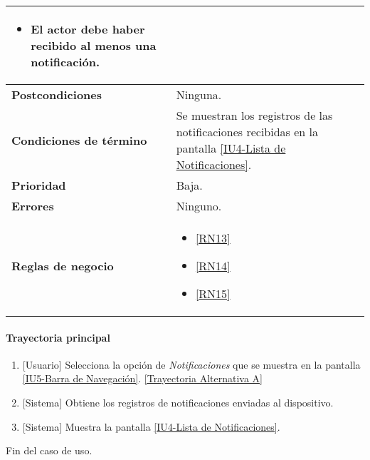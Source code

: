 \begin{longtable}{|J{5cm}|J{10.3cm}|}
\begin{itemize}
		    \item El actor debe haber recibido al menos una notificación.
		\end{itemize}
		\\ \hline
	\textbf{Postcondiciones} & Ninguna.
		\\ \hline
	\textbf{Condiciones de término} & Se muestran los registros de las notificaciones recibidas en la pantalla \hyperref[fig:Lista de Notificaciones]{[IU4-Lista de Notificaciones]}.
		\\ \hline 
	\textbf{Prioridad} & 
		Baja. \\ \hline
	\textbf{Errores} & Ninguno.
		\\ \hline
	\textbf{Reglas de negocio} & 
		\begin{itemize}
		 	\item \ref{RN13}
		 	\item \ref{RN14}
		 	\item \ref{RN15}
		\end{itemize}
		 \\ \hline
\end{longtable}

\paragraph{Trayectoria principal} \label{SUB-U-CU1.9:TP}
	\begin{enumerate}
		\item {[Usuario]} Selecciona la opción de \textit{Notificaciones} que se muestra en la pantalla  \hyperref[fig:Barra de navegacion]{[IU5-Barra de Navegación]}. \hyperref[SUB-U-CU1.9:TA]{[Trayectoria Alternativa A]}
		\item {[Sistema]} Obtiene los registros de notificaciones enviadas al dispositivo.
		\item {[Sistema]} Muestra la pantalla \hyperref[fig:Lista de Notificaciones]{[IU4-Lista de Notificaciones]}.
	\end{enumerate}
	Fin del caso de uso.

